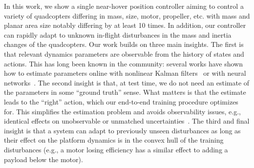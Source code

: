 %
% 
In this work, we show a single near-hover position controller aiming to control a variety of quadcopters differing in mass, size, motor, propeller, etc. with mass and planar area size notably differing by at least 10 times. 
%
In addition, our controller can rapidly adapt to unknown in-flight disturbances in the mass and inertia changes of the quadcopters.
%
Our work builds on three main insights.
%
The first is that relevant dynamics parameters are observable from the history of states and actions.
%
This has long been known in the community: several works have shown how to estimate parameters online with nonlinear Kalman filters~\cite{svacha2020imu,wuest2019online} or with neural networks~\cite{forgione2021continuous}.
%
The second insight is that, at test time, we do not need an estimate of the parameters in some “ground truth” sense.
%
What matters is that the estimate leads to the “right” action, which our end-to-end training procedure optimizes for.
%
This simplifies the estimation problem and avoids observability issues, e.g., identical effects on unobservable or unmatched uncertainties~\cite{hovakimyan2010l1}.
%
%
%
The third and final insight is that a system can adapt to previously unseen disturbances as long as their effect on the platform dynamics is in the convex hull of the training disturbances (e.g., a motor losing efficiency has a similar effect to adding a payload below the motor).

